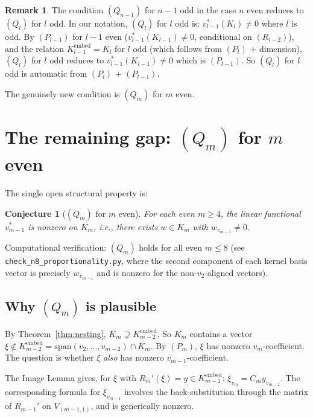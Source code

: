 \documentclass[11pt]{article}
\newtheorem{conjecture}[theorem]{Conjecture}
\theoremstyle{definition}
\newtheorem{remark}[theorem]{Remark}
\begin{document}
\begin{remark}
The condition $(Q_{n-1})$ for $n-1$ odd in the case $n$ even reduces
to $(Q_l)$ for $l$ odd. In our notation, $(Q_l)$ for $l$ odd is:
$v_{l-1}^*(K_l) \neq 0$ where $l$ is odd. By $(P_{l-1})$ for $l-1$
even ($v_{l-1}^*(K_{l-1}) \neq 0$, conditional on $(R_{l-2})$), and
the relation $K_{l-1}^{\mathrm{embed}} = K_l$ for $l$ odd (which
follows from $(P_l)$ + dimension), $(Q_l)$ for $l$ odd reduces to
$v_{l-1}^*(K_{l-1}) \neq 0$ which is $(P_{l-1})$. So $(Q_l)$ for $l$
odd is automatic from $(P_l)$ + $(P_{l-1})$.

The genuinely new condition is $(Q_m)$ for $m$ even.
\end{remark}

\section{The remaining gap: $(Q_m)$ for $m$ even}
\label{sec:Q-gap}

The single open structural property is:

\begin{conjecture}[$(Q_m)$ for $m$ even]\label{conj:Qm}
For each even $m \ge 4$, the linear functional $v_{m-1}^*$ is
nonzero on $K_m$, i.e., there exists $w \in K_m$ with
$w_{v_{m-1}} \neq 0$.
\end{conjecture}

Computational verification: $(Q_m)$ holds for all even $m \le 8$
(see \texttt{check\_n8\_proportionality.py}, where the second
component of each kernel basis vector is precisely $w_{v_{m-1}}$
and is nonzero for the non-$v_2$-aligned vectors).

\subsection{Why $(Q_m)$ is plausible}

By Theorem~\ref{thm:nesting}, $K_m \supsetneq K_{m-2}^{\mathrm{embed}}$.
So $K_m$ contains a vector $\xi \notin K_{m-2}^{\mathrm{embed}} =
\mathrm{span}(v_2,\ldots,v_{m-2}) \cap K_m$. By $(P_m)$, $\xi$ has
nonzero $v_m$-coefficient. The question is whether $\xi$
\emph{also} has nonzero $v_{m-1}$-coefficient.

The Image Lemma gives, for $\xi$ with $R_m'(\xi) = y \in K_{m-1}^{\mathrm{embed}}$:
$\xi_{v_m} = C_m y_{v_{m-2}}$. The corresponding formula for
$\xi_{v_{m-1}}$ involves the back-substitution through the matrix
of $R_{m-1}'$ on $V_{(m-1,1)}$, and is generically nonzero.
\end{document}
